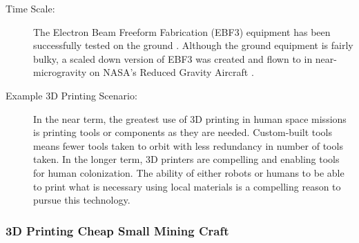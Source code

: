 \begin{description}
\item[Time Scale:] The Electron  Beam Freeform Fabrication (EBF3) equipment has been successfully tested  on the ground \cite{Taminger2006}. Although the ground equipment is fairly bulky, a  scaled down version of EBF3 was created and flown to in  near-microgravity on NASA's Reduced Gravity Aircraft \cite{Dillow2009}.
 
\item[Example 3D Printing  Scenario:]
In the near term, the greatest use  of 3D printing in human space missions is printing tools or components  as they are needed. Custom-built tools means fewer tools taken to orbit  with less redundancy in number of tools taken. In the longer term, 3D  printers are compelling and enabling tools for human colonization. The  ability of either robots or humans to be able to print what is necessary  using local materials is a compelling reason to pursue this technology.

   \end{description}
 
 \subsubsection{3D Printing Cheap Small Mining Craft}

